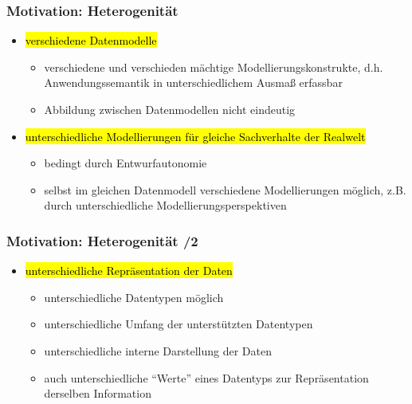     \begin{frame}
    \frametitle{Motivation: Heterogenität}
    
    \begin{itemize}
    \item \hl{verschiedene Datenmodelle}
    \begin{itemize}
    \item verschiedene und verschieden mächtige Modellierungskonstrukte,
      d.h. Anwendungssemantik in unterschiedlichem Ausmaß erfassbar 
    \item Abbildung zwischen Datenmodellen nicht eindeutig
    \end{itemize}
    \item \hl{unterschiedliche Modellierungen für gleiche Sachverhalte der
        Realwelt}  
    \begin{itemize}
    \item bedingt durch Entwurfautonomie
    \item selbst im gleichen Datenmodell verschiedene Modellierungen
      möglich, z.B. durch unterschiedliche Modellierungsperspektiven 
    \end{itemize}
    \end{itemize}
    
    \end{frame}
    
    
    \begin{frame}
    \frametitle{Motivation: Heterogenität /2}
    
    \begin{itemize}
    \item \hl{unterschiedliche Repräsentation der Daten}
    \begin{itemize}
    \item unterschiedliche Datentypen möglich
    \item unterschiedliche Umfang der unterstützten Datentypen
    \item unterschiedliche interne Darstellung der Daten
    \item auch unterschiedliche "`Werte"' eines Datentyps zur
      Repräsentation derselben Information 
    \end{itemize}
    \end{itemize}
    
    \end{frame}
    
